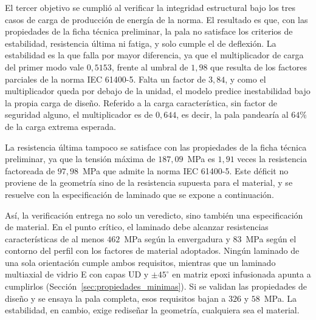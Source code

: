 El tercer objetivo se cumplió al verificar la integridad estructural bajo los tres casos de carga de producción de energía de la norma. El resultado es que, con las propiedades de la ficha técnica preliminar, la pala no satisface los criterios de estabilidad, resistencia última ni fatiga, y solo cumple el de deflexión. La estabilidad es la que falla por mayor diferencia, ya que el multiplicador de carga del primer modo vale $0{,}5153$, frente al umbral de $1{,}98$ que resulta de los factores parciales de la norma IEC 61400-5. Falta un factor de $3{,}84$, y como el multiplicador queda por debajo de la unidad, el modelo predice inestabilidad bajo la propia carga de diseño. Referido a la carga característica, sin factor de seguridad alguno, el multiplicador es de $0{,}644$, es decir, la pala pandearía al $64\%$ de la carga extrema esperada.

La resistencia última tampoco se satisface con las propiedades de la ficha técnica preliminar, ya que la tensión máxima de $187{,}09$~MPa es $1{,}91$ veces la resistencia factoreada de $97{,}98$~MPa que admite la norma IEC 61400-5. Este déficit no proviene de la geometría sino de la resistencia supuesta para el material, y se resuelve con la especificación de laminado que se expone a continuación.

Así, la verificación entrega no solo un veredicto, sino también una especificación de material. En el punto crítico, el laminado debe alcanzar resistencias características de al menos $462$~MPa según la envergadura y $83$~MPa según el contorno del perfil con los factores de material adoptados. Ningún laminado de una sola orientación cumple ambos requisitos, mientras que un laminado multiaxial de vidrio E con capas UD y $\pm 45^\circ$ en matriz epoxi infusionada apunta a cumplirlos (Sección~\ref{sec:propiedades_minimas}). Si se validan las propiedades de diseño y se ensaya la pala completa, esos requisitos bajan a $326$ y $58$~MPa. La estabilidad, en cambio, exige rediseñar la geometría, cualquiera sea el material.


